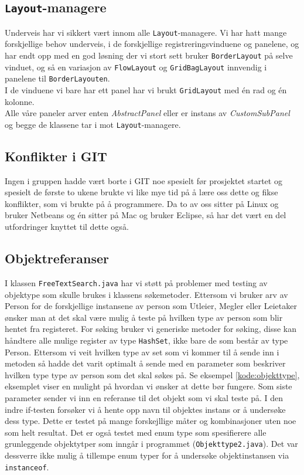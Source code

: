 \subsection{\texttt{Layout}-managere}
Underveis har vi sikkert vært innom alle \texttt{Layout}-managere. Vi har hatt mange forskjellige behov underveis, i de forskjellige registreringsvinduene og panelene, og har endt opp med en god løsning der vi stort sett bruker \texttt{BorderLayout} på selve vinduet, og så en variasjon av \texttt{FlowLayout} og \texttt{GridBagLayout} innvendig i panelene til \texttt{BorderLayouten}. \\
I de vinduene vi bare har ett panel har vi brukt \texttt{GridLayout} med én rad og én kolonne. \\
Alle våre paneler arver enten \emph{AbstractPanel} eller er instans av \emph{CustomSubPanel} og begge de klassene tar i mot \texttt{Layout}-managere.

\subsection{Konflikter i GIT}
Ingen i gruppen hadde vært borte i GIT noe spesielt før prosjektet startet og spesielt de første to ukene brukte vi like mye tid på å lære oss dette og fikse konflikter, som vi brukte på å programmere. Da to av oss sitter på Linux og bruker Netbeans og én sitter på Mac og bruker Eclipse, så har det vært en del utfordringer knyttet til dette også.


\subsection{Objektreferanser}
I klassen \texttt{FreeTextSearch.java} har vi støtt på problemer med testing av objektype som skulle brukes i klassens søkemetoder. Ettersom vi bruker arv av Person for de forskjellige instansene av person som Utleier, Megler eller Leietaker ønsker man at det skal være mulig å teste på hvilken type av person som blir hentet fra registeret. For søking bruker vi generiske metoder for søking, disse kan håndtere alle mulige register av type \texttt{HashSet}, ikke bare de som består av type Person. Ettersom vi veit hvilken type av set som vi kommer til å sende inn i metoden så hadde det varit optimalt å sende med en parameter som beskriver hvilken type type av person som det skal søkes på. Se eksempel \ref{kode:objekttype}, eksemplet viser en mulight på hvordan vi ønsker at dette bør fungere. Som siste parameter sender vi inn en referanse til det objekt som vi skal teste på. I den indre if-testen forsøker vi å hente opp navn til objektes instans or å undersøke dess type. Dette er testet på mange forskejllige måter og kombinasjoner uten noe som helt resultat. Det er også testet med enum type som spesifierere alle grunleggende objektytper som inngår i programmet (\texttt{Objekttype2.java}). Det var dessverre ikke mulig å tillempe enum typer for å undersøke objektinstansen via \texttt{instanceof}.


